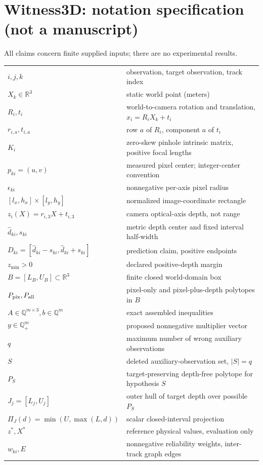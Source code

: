 \documentclass[11pt]{article}
\begin{document}
\section*{Witness3D: notation specification (not a manuscript)}
All claims concern finite supplied inputs; there are no experimental results.
\begin{center}\begin{tabular}{ll}
$i,j,k$ & observation, target observation, track index\\
$X_k\in\mathbb R^3$ & static world point (meters)\\
$R_i,t_i$ & world-to-camera rotation and translation, $x_i=R_iX_k+t_i$\\
$r_{i,a},t_{i,a}$ & row $a$ of $R_i$, component $a$ of $t_i$\\
$K_i$ & zero-skew pinhole intrinsic matrix, positive focal lengths\\
$p_{ki}=(u,v)$ & measured pixel center; integer-center convention\\
$\epsilon_{ki}$ & nonnegative per-axis pixel radius\\
$[l_x,h_x]\times[l_y,h_y]$ & normalized image-coordinate rectangle\\
$z_i(X)=r_{i,3}X+t_{i,3}$ & camera optical-axis depth, not range\\
$\hat d_{ki},s_{ki}$ & metric depth center and fixed interval half-width\\
$D_{ki}=[\hat d_{ki}-s_{ki},\hat d_{ki}+s_{ki}]$ & prediction claim, positive endpoints\\
$z_{\min}>0$ & declared positive-depth margin\\
$B=[L_B,U_B]\subset\mathbb R^3$ & finite closed world-domain box\\
$P_{\rm pix},P_{\rm all}$ & pixel-only and pixel-plus-depth polytopes in $B$\\
$A\in\mathbb Q^{m\times3},b\in\mathbb Q^m$ & exact assembled inequalities\\
$y\in\mathbb Q_+^m$ & proposed nonnegative multiplier vector\\
$q$ & maximum number of wrong auxiliary observations\\
$S$ & deleted auxiliary-observation set, $|S|=q$\\
$P_S$ & target-preserving depth-free polytope for hypothesis $S$\\
$J_j=[L_j,U_j]$ & outer hull of target depth over possible $P_S$\\
$\Pi_J(d)=\min(U,\max(L,d))$ & scalar closed-interval projection\\
$z^*,X^*$ & reference physical values, evaluation only\\
$w_{ki},E$ & nonnegative reliability weights, inter-track graph edges
\end{tabular}\end{center}
\end{document}
